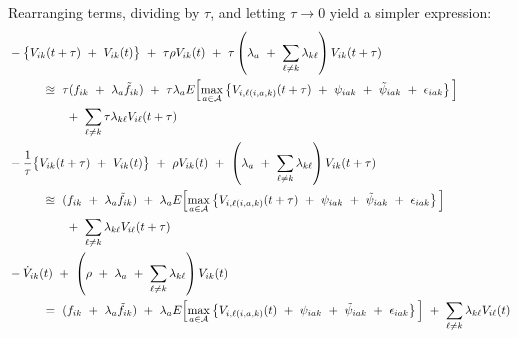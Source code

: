 Rearranging terms, dividing by $\tau$, and letting $\tau \rightarrow 0$ yield a simpler expression:
\begin{equation*}
\begin{split}
    & -\big\{ V_{ik} (t + \tau) \ + \ V_{ik} (t) \big\} \ + \ \tau \rho V_{ik} (t) \ + \ \tau \left( \lambda_{a} \ + \ \sum_{\ell \neq k} \lambda_{k\ell} \right) V_{ik}(t + \tau) \\
    & \hspace{1.0cm} \approxeq \ \tau (f_{ik} \ + \ \lambda_{a} \tilde{f}_{ik}) \ + \ \tau \lambda_{a} E\Big[ \underset{a \in \mathcal{A}}{\max} \left\{ V_{i,\ell(i, a, k)} (t + \tau) \ + \ \psi_{iak} \ + \ \tilde{\psi}_{iak} \ + \ \epsilon_{iak} \right\} \Big] \\
    & \hspace{1.7cm} + \ \sum_{\ell \neq k} \tau \lambda_{k\ell} V_{i\ell}(t + \tau) \\
    & -\frac{1}{\tau} \big\{ V_{ik} (t + \tau) \ + \ V_{ik} (t) \big\} \ + \ \rho V_{ik}(t) \ + \ \left( \lambda_{a} \ + \ \sum_{\ell \neq k} \lambda_{k\ell} \right) V_{ik}(t + \tau) \\
    & \hspace{1.0cm} \approxeq \ (f_{ik} \ + \ \lambda_{a} \tilde{f}_{ik}) \ + \ \lambda_{a} E\Big[ \underset{a \in \mathcal{A}}{\max} \left\{ V_{i,\ell(i, a, k)} (t + \tau) \ + \ \psi_{iak} \ + \ \tilde{\psi}_{iak} \ + \ \epsilon_{iak} \right\} \Big] \\
    & \hspace{1.7cm} + \ \sum_{\ell \neq k} \lambda_{k\ell} V_{i\ell}(t + \tau) \\
    & -\dot{V}_{ik} (t) \ + \ \left( \rho \ + \ \lambda_{a} \ + \ \sum_{\ell \neq k} \lambda_{k\ell} \right) V_{ik}(t) \\
    & \hspace{1.0cm} = \ (f_{ik} \ + \ \lambda_{a} \tilde{f}_{ik}) \ + \ \lambda_{a} E\Big[ \underset{a \in \mathcal{A}}{\max} \left\{ V_{i,\ell(i, a, k)} (t) \ + \ \psi_{iak} \ + \ \tilde{\psi}_{iak} \ + \ \epsilon_{iak} \right\} \Big] \ + \ \sum_{\ell \neq k} \lambda_{k\ell} V_{i\ell}(t)
\end{split}
\end{equation*}